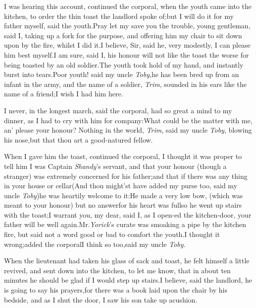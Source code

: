 \documentclass{article}
\begin{document}
I was hearing this account, continued the corporal, when the
youth came into the kitchen, to order the thin toast the landlord
spoke of;\tsh but I will do it for my father myself, said
the youth.\break\tsh Pray let my save you the trouble,
young gentleman, said I, taking up a\break
fork for the purpose, and offering him\break
my chair to sit down upon by the fire,\break
whilst I did it.\tsh I believe, Sir, said he,\break
very modestly, I can please him best\break
myself.\tsh I am sure, said I, his honour\break
will not like the toast the worse for being\break
toasted by an old soldier.\tsh The youth\break
took hold of my hand, and instantly\break
burst into tears.\tsh Poor youth! said\break
my uncle \textit{Toby},\tsk he has been bred up\break
from an infant in the army, and the\break
name of a soldier, \textit{Trim}, sounded in his\break
ears like the name of a friend;\tsk I wish\break
I had him here.

\tsh I never, in the longest march, said the corporal,
had so great a mind to my dinner, as I had to cry with him for
company:\tsk What could be the matter with me, an’ please
your honour? Nothing in the world, \textit{Trim}, said my uncle
\textit{Toby}, blowing his nose,\tsk but that thou art a
good-natured fellow.

When I gave him the toast, continued the corporal, I thought it
was proper to tell him I was Captain \textit{Shandy}’s servant,
and that your honour (though a stranger) was extremely concerned
for his father;\tsk and that if there was any thing in your house
or cellar\tsh (And thou might’st have added my purse
too, said my uncle \textit{Toby})\tsh he was heartily
welcome to it:\tsh He made a very low bow, (which was meant
to your honour) but no answer\tsk for his heart was
full\tsk\break so he went up stairs with the toast;\tsk I warrant
you, my dear, said I, as I open-\break ed the kitchen-door, your father
will be well again.\tsh Mr.\@ \textit{Yorick}’s
curate was 
smoaking a pipe by the kitchen fire,\tsk\break
but said not a word good or bad to comfort the youth.\tsh I thought it
wrong;\break added the corporal\tsh I think so
too,\break said my
uncle \textit{Toby.}

When the lieutenant had taken his glass of sack and toast, he
felt himself a little revived, and sent down into the kitchen, to
let me know, that in about\break
ten minutes he should be glad if I\break
would step up stairs.\tsh I believe, said the landlord, he is
going to say his prayers,\tsh for there was a book laid
upon the chair by his bedside, and as I shut the door, I saw his
son take up a\break cushion.\tsh
\end{document}
